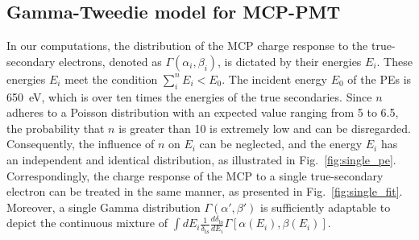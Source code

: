 \subsection{Gamma-Tweedie model for MCP-PMT}\label{sec:model}
In our computations, the distribution of the MCP charge response to the true-secondary electrons, denoted as $\varGamma(\alpha_{i},\beta_{i})$, is dictated by their energies $E_{i}$. These energies $E_{i}$ meet the condition $\sum_{i}^{n}E_{i}<E_0$. The incident energy \(E_0\) of the PEs is \SI{650}{eV}, which is over ten times the energies of the true secondaries. Since $n$ adheres to a Poisson distribution with an expected value ranging from 5 to 6.5, the probability that $n$ is greater than 10 is extremely low and can be disregarded. Consequently, the influence of $n$ on $E_{i}$ can be neglected, and the energy \(E_{i}\) has an independent and identical distribution, as illustrated in Fig.~\ref{fig:single_pe}. Correspondingly, the charge response of the MCP to a single true-secondary electron can be treated in the same manner, as presented in Fig.~\ref{fig:single_fit}. Moreover, a single Gamma distribution \(\varGamma(\alpha',\beta')\) is sufficiently adaptable to depict the continuous mixture of \(\int dE_{i}\frac{1} {\delta_{\mathrm{ts}}}\frac{d\delta_{\mathrm{ts}}} {dE_{i}}\varGamma[\alpha(E_{i}),\beta(E_{i})]\).

